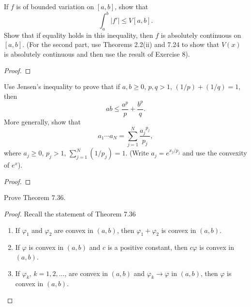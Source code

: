 \begin{problem}
If $f$ is of bounded variation on $[a,b]$, show that
\[
\int_a^b|f'|\leq V[a,b].
\]
Show that if equality holds in this inequality, then $f$ is absolutely
continuous on $[a,b]$. (For the second part, use Theorems 2.2(ii) and 7.24
to show that $V(x)$ is absolutely continuous and then use the result of
Exercise 8).
\end{problem}
\begin{proof}
\end{proof}
\newpage

\begin{problem}
Use Jensen's inequality to prove that if $a,b\geq 0$, $p,q>1$,
$(1/p)+(1/q)=1$, then
\[
ab\leq\frac{a^p}{p}+\frac{b^p}{q}.
\]
More generally, show that
\[
a_1\dotsm a_N=\sum_{j=1}^N\frac{{a_j}^{p_j}}{p_j},
\]
where $a_j\geq 0$, $p_j>1$, $\sum_{j=1}^N(1/p_j)=1$. (Write
$a_j=e^{x_j/p_j}$ and use the convexity of $e^x$).
\end{problem}
\begin{proof}
\end{proof}
\newpage

\begin{problem}
Prove Theorem 7.36.
\end{problem}
\begin{proof}
Recall the statement of Theorem 7.36
\begin{theorem*}
\begin{enumerate}[label=\textnormal{(\roman*)}]
\item If $\varphi_1$ and $\varphi_2$ are convex in $(a,b)$, then
  $\varphi_1+\varphi_2$ is convex in $(a,b)$.
\item If $\varphi$ is convex in $(a,b)$ and $c$ is a positive constant,
  then $c\varphi$ is convex in $(a,b)$.
\item If $\varphi_k$, $k=1,2,\dotsc$, are convex in $(a,b)$ and
  $\varphi_k\to\varphi$ in $(a,b)$, then $\varphi$ is convex in $(a,b)$.
\end{enumerate}
\end{theorem*}
\end{proof}


